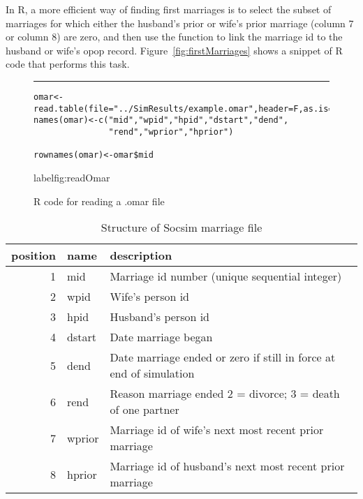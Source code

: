 In R, a more efficient way of finding first marriages is to select the
subset of marriages for which either the husband's prior or wife's
prior marriage (column 7 or column 8) are zero, and then use the
 function to link the marriage id to the husband or
wife's opop record.  Figure~\ref{fig:firstMarriages} shows a snippet
of R code that performs this task.





\begin{figure}[h]
  \centering
\vspace{.25cm}
\rule{.5 \textwidth}{.1mm}
\begin{verbatim}
omar<-read.table(file="../SimResults/example.omar",header=F,as.is=T)
names(omar)<-c("mid","wpid","hpid","dstart","dend",
               "rend","wprior","hprior")
   
rownames(omar)<-omar$mid

\end{verbatim}
  \caption{R code for reading a .omar file}
  label{fig:readOmar}
\end{figure}

\begin{table}[h]
  \centering
  \begin{tabular}{||r|l|p{5cm}||}
\hline
\textbf{position}&\textbf{name}&\textbf{description}\\
\hline \hline
1&mid& Marriage id number (unique sequential integer) \\
2&wpid &Wife's person id\\
3&hpid &Husband's person id \\
4&dstart &Date marriage began \\
5&dend&Date marriage ended or zero if still in force at end of simulation\\
6&rend &Reason marriage ended 2 = divorce; 3 = death of one partner \\
7&wprior &Marriage id of wife's next most recent prior marriage\\
8&hprior&Marriage id of husband's next most recent prior marriage\\
\hline    
  \end{tabular}
  \caption{Structure of Socsim marriage file}
  \label{tab:marriagefile}
\end{table}

